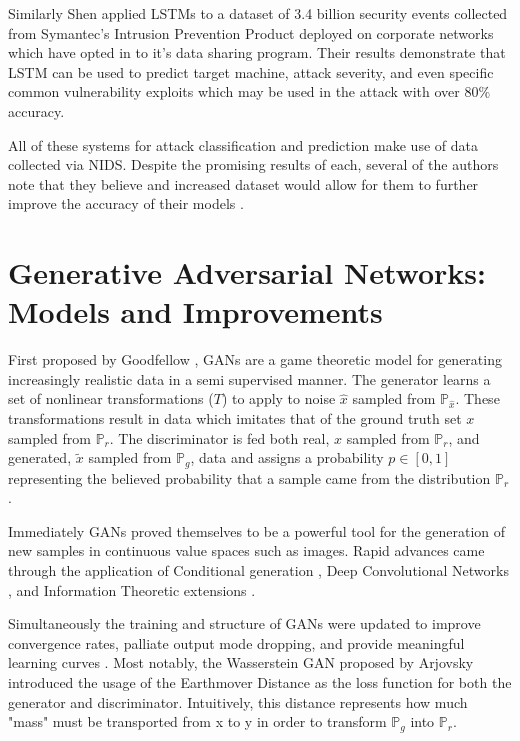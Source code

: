 \documentclass[12pt,american]{report}
\def\P{\mathbb{P}}
\begin{document}
Similarly Shen \etal \cite{Shen2018} applied LSTMs to a dataset of 3.4 billion security events collected from Symantec's Intrusion Prevention Product deployed on corporate networks which have opted in to it's data sharing program. Their results demonstrate that LSTM can be used to predict target machine, attack severity, and even specific common vulnerability exploits which may be used in the attack with over $80\%$ accuracy. 

All of these systems for attack classification and prediction make use of data collected via NIDS. Despite the promising results of each, several of the authors note that they believe and increased dataset would allow for them to further improve the accuracy of their models \cite{us, Faber2018, Shen2018}. 

\section{Generative Adversarial Networks: Models and Improvements}

First proposed by Goodfellow \etal \cite{Goodfellow2014}, GANs are a game theoretic model for generating increasingly realistic data in a semi supervised manner. The generator learns a set of nonlinear transformations ($T$) to apply to noise $\widehat{x}$ sampled from $\P_{\widehat{x}}$. These transformations result in data which imitates that of the ground truth set $x$ sampled from $\P_r$. The discriminator is fed both real,  $x$ sampled from $\P_r$, and generated, $\widetilde{x}$ sampled from $\P_g$, data and assigns a probability $p \in [0,1]$ representing the believed probability that a sample came from the distribution $\P_r$. 

Immediately GANs proved themselves to be a powerful tool for the generation of new samples in continuous value spaces such as images. Rapid advances came through the application of Conditional generation \cite{Mirza2014}, Deep Convolutional Networks \cite{Radford2015}, and Information Theoretic extensions \cite{Chen2016}. 

Simultaneously the training and structure of GANs were updated to improve convergence rates, palliate output mode dropping, and provide meaningful learning curves \cite{Salimans, Arjovsky2017, Gulrajani2017}. Most notably, the Wasserstein GAN proposed by Arjovsky \etal \cite{Arjovsky2017} introduced the usage of the Earthmover Distance as the loss function for both the generator and discriminator. Intuitively, this distance represents how much "mass" must be transported from x to y in order to transform $\P_g$ into $\P_r$. 
\end{document}
